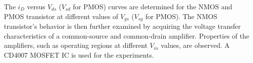 The $i_D$ versus $V_{ds}$ ($V_{sd}$ for PMOS) curves are determined for the NMOS and PMOS transistor at different values of $V_{gs}$ ($V_{sg}$ for PMOS). The NMOS transistor's behavior is then further examined by acquiring the voltage transfer characteristics of a common-source and common-drain amplifier. Properties of the amplifiers, such as operating regions at different $V_{in}$ values, are observed. A CD4007 MOSFET IC is used for the experiments.
